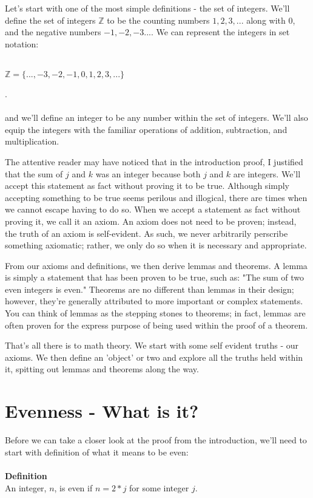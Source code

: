 \documentclass[a4paper,12pt]{article}
\begin{document}
Let's start with one of the most simple definitions - the set of integers. We'll define the set of integers $\mathbb{Z}$ to be the counting numbers $1, 2, 3, ...$ along with $0$, and the negative numbers ${-}1, {-}2, {-}3 ...$. We can represent the integers in set notation: \\
\\
\centerline{$\mathbb{Z} = \{ ..., {-3}, {-2}, {-1}, 0, 1, 2, 3, ... \}$}. \\
\\
and we'll define an integer to be any number within the set of integers. We'll also equip the integers with the familiar operations of addition, subtraction, and multiplication.    

The attentive reader may have noticed that in the introduction proof, I justified that the sum of $j$ and $k$ was an integer because both $j$ and $k$ are integers. We'll accept this statement as fact without proving it to be true. Although simply accepting something to be true seems perilous and illogical, there are times when we cannot escape having to do so. When we accept a statement as fact without proving it, we call it an axiom. An axiom does not need to be proven; instead, the truth of an axiom is self-evident. As such, we never arbitrarily perscribe something axiomatic; rather, we only do so when it is necessary and appropriate.

From our axioms and definitions, we then derive lemmas and theorems. A lemma is simply a statement that has been proven to be true, such as: "The sum of two even integers is even." Theorems are no different than lemmas in their design; however, they're generally attributed to more important or complex statements. You can think of lemmas as the stepping stones to theorems; in fact, lemmas are often proven for the express purpose of being used within the proof of a theorem. 

That's all there is to math theory. We start with some self evident truths - our axioms. We then define an 'object' or two and explore all the truths held within it, spitting out lemmas and theorems along the way. 

\section{Evenness - What is it?}
Before we can take a closer look at the proof from the introduction, we'll need to start with definition of what it means to be even: \\
\\
\textbf{Definition} \\
An integer, $n$, is even if $n = 2*j$ for some integer $j$. \\
\end{document}
